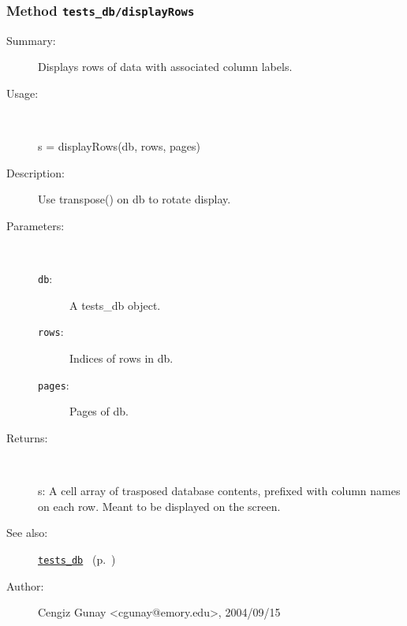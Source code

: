 \subsubsection[Method \texttt{displayRows}]{Method \texttt{tests\_db/displayRows}}%
%
\label{ref_tests_db__displayRows}%
\hypertarget{ref_tests_db__displayRows}{}%
\begin{description}
\item[Summary:]Displays rows of data with associated column labels.
%
\item[Usage:]~%
\begin{lyxcode}%
s = displayRows(db, rows, pages)
%
\end{lyxcode}%
%
\item[Description:]%
Use transpose() on db to rotate display.
\item[Parameters:]~
\begin{description}%
\item[\texttt{db}:]
 A tests\_db object.
\item[\texttt{rows}:]
 Indices of rows in db.
\item[\texttt{pages}:]
 Pages of db.
\end{description}%
%
\item[Returns:
]~

   s: A cell array of trasposed database contents, prefixed with 
	column names on each row. Meant to be displayed on the screen.
%
%
\item[See also:]%
\hyperlink{ref_tests_db}{\texttt{tests\_db}}%
\ (p.~\pageref{ref_tests_db})%
%
%
\item[Author:]%
Cengiz Gunay <cgunay@emory.edu>, 2004/09/15
%
\end{description}
\methodline%
